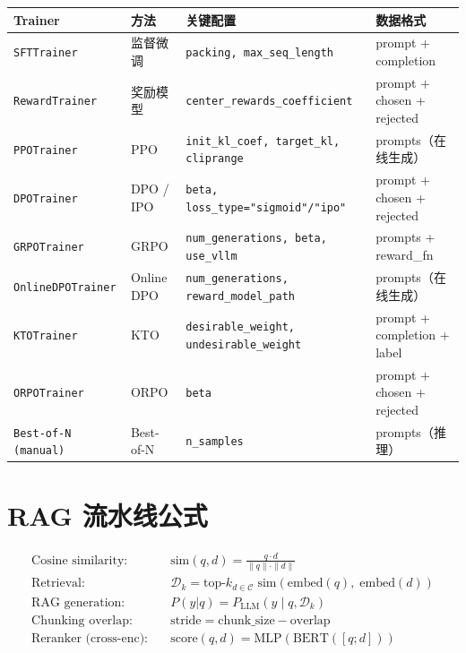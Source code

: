 \noindent\begin{tabularx}{\linewidth}{@{}l Z{0.3} Z{1.58} Z{1.12}@{}}
\toprule
\textbf{Trainer} & \textbf{方法} & \textbf{关键配置} & \textbf{数据格式} \\
\midrule
\texttt{SFTTrainer} & 监督微调 & \texttt{packing, max\_seq\_length} & prompt + completion \\
\texttt{RewardTrainer} & 奖励模型 & \texttt{center\_rewards\_coefficient} & prompt + chosen + rejected \\
\texttt{PPOTrainer} & PPO & \texttt{init\_kl\_coef, target\_kl, cliprange} & prompts（在线生成） \\
\texttt{DPOTrainer} & DPO / IPO & \texttt{beta, loss\_type="sigmoid"/"ipo"} & prompt + chosen + rejected \\
\texttt{GRPOTrainer} & GRPO & \texttt{num\_generations, beta, use\_vllm} & prompts + reward\_fn \\
\texttt{OnlineDPOTrainer} & Online DPO & \texttt{num\_generations, reward\_model\_path} & prompts（在线生成） \\
\texttt{KTOTrainer} & KTO & \texttt{desirable\_weight, undesirable\_weight} & prompt + completion + label \\
\texttt{ORPOTrainer} & ORPO & \texttt{beta} & prompt + chosen + rejected \\
\texttt{Best-of-N (manual)} & Best-of-N & \texttt{n\_samples} & prompts（推理） \\
\bottomrule
\end{tabularx}

\section{RAG 流水线公式}
\label{rag-pipeline-formulas}

\begin{align}
\text{Cosine similarity:}&\quad \text{sim}(q, d) = \frac{q \cdot d}{\|q\| \cdot \|d\|} \\
\text{Retrieval:}&\quad \mathcal{D}_k = \text{top-}k_{d \in \mathcal{C}} \; \text{sim}(\text{embed}(q),\; \text{embed}(d)) \\
\text{RAG generation:}&\quad P(y|q) = P_\text{LLM}(y \;|\; q, \mathcal{D}_k) \\
\text{Chunking overlap:}&\quad \text{stride} = \text{chunk\_size} - \text{overlap} \\
\text{Reranker (cross-enc):}&\quad \text{score}(q, d) = \text{MLP}(\text{BERT}([q; d]))
\end{align}

